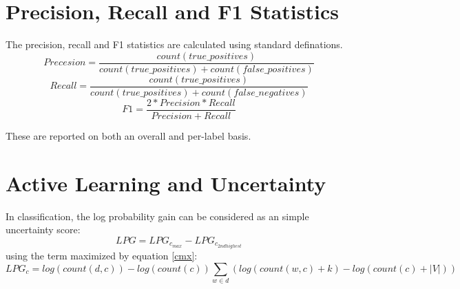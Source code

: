 \documentclass{article}
\begin{document}
\section{Precision, Recall and F1 Statistics}
The precision, recall and F1 statistics are calculated using standard definations.
\begin{equation}\label{precision}
Precesion = \frac{count(true\_positives)}{ count(true\_positives) + count(false\_positives)}
\end{equation}
\begin{equation}\label{recall}
Recall = \frac{count(true\_positives)}{ count(true\_positives) + count(false\_negatives)}
\end{equation}
\begin{equation}\label{F1}
F1 = \frac{2*Precision*Recall}{Precision+Recall} 
\end{equation}

These are reported on both an overall and per-label basis.
\section{Active Learning and Uncertainty}
In classification, the log probability gain can be considered as an simple uncertainty score:
\begin{equation}\label{lpg1}
LPG = LPG_{c_{max}} - LPG_{c_{2nd highest}}
\end{equation}
using the term maximized by equation \ref{cmx}:
\begin{equation}\label{lpg2}
LPG_{c} = log(count(d,c)) - log(count(c))  \sum_{w \in d} ( log(count(w,c)+k) - log(count(c) + |V|) )
\end{equation}
\end{document}
